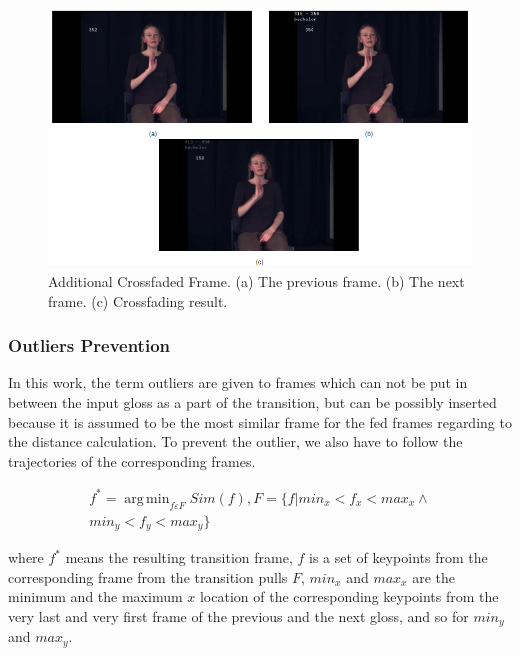 \documentclass{sig-alternate-05-2015}
\DeclareMathOperator*{\argminA}{arg\,min}
\begin{document}
\begin{figure}
	\centering
	\includegraphics[width=\linewidth]{img/crossfading.png}
	\caption{Additional Crossfaded Frame. (a) The previous frame. (b) The next frame. (c) Crossfading result.}
\end{figure}

\subsubsection{Outliers Prevention}
In this work, the term outliers are given to frames which can not be put in between the input gloss as a part of the transition, but can be possibly inserted because it is assumed to be the most similar frame for the fed frames regarding to the distance calculation. To prevent the outlier, we also have to follow the trajectories of the corresponding frames.

\begin{equation}
\begin{aligned}
f^\ast = \argminA_{f \varepsilon F} Sim(f) ,
F=\{f|min_x<f_x<max_x  \land  \\
min_y<f_y<max_y\}
\end{aligned}
\end{equation}

where \begin{math}f^\ast\end{math} means the resulting transition frame, \begin{math}f\end{math} is a set of keypoints from the corresponding frame from the transition pulls \begin{math}F\end{math}, \begin{math}min_x\end{math} and \begin{math}max_x\end{math} are the minimum and the maximum \begin{math}x\end{math} location of the corresponding keypoints from the very last and very first frame of the previous and the next gloss, and so for \begin{math}min_y\end{math} and \begin{math}max_y\end{math}.
\end{document}
